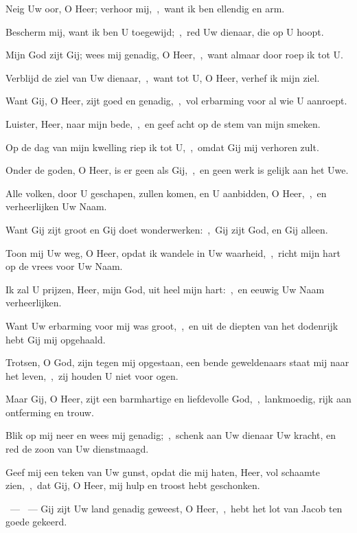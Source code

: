 \documentclass[12pt,twoside,a5paper]{article}
\begin{document}
\begin{halfparskip}
   Neig Uw oor, O Heer; verhoor mij,~\sep\ want ik ben ellendig en arm.

  Bescherm mij, want ik ben U toegewijd;~\sep\ red Uw dienaar, die op U hoopt.

  Mijn God zijt Gij; wees mij genadig, O Heer,~\sep\ want almaar door roep ik tot U.

  Verblijd de ziel van Uw dienaar,~\sep\ want tot U, O Heer, verhef ik mijn ziel.

  Want Gij, O Heer, zijt goed en genadig,~\sep\ vol erbarming voor al wie U aanroept.

  Luister, Heer, naar mijn bede,~\sep\ en geef acht op de stem van mijn smeken.

  Op de dag van mijn kwelling riep ik tot U,~\sep\ omdat Gij mij verhoren zult.

  Onder de goden, O Heer, is er geen als Gij,~\sep\ en geen werk is gelijk aan het Uwe.

  Alle volken, door U geschapen, zullen komen, en U aanbidden, O Heer,~\sep\ en verheerlijken Uw Naam.

  Want Gij zijt groot en Gij doet wonderwerken:~\sep\ Gij zijt God, en Gij alleen.

  Toon mij Uw weg, O Heer, opdat ik wandele in Uw waarheid,~\sep\ richt mijn hart op de vrees voor Uw Naam.

  Ik zal U prijzen, Heer, mijn God, uit heel mijn hart:~\sep\ en eeuwig Uw Naam verheerlijken.

  Want Uw erbarming voor mij was groot,~\sep\ en uit de diepten van het dodenrijk hebt Gij mij opgehaald.

  Trotsen, O God, zijn tegen mij opgestaan, een bende geweldenaars staat mij naar het leven,~\sep\ zij houden U niet voor ogen.

  Maar Gij, O Heer, zijt een barmhartige en liefdevolle God,~\sep\ lankmoedig, rijk aan ontferming en trouw.

  Blik op mij neer en wees mij genadig;~\sep\ schenk aan Uw dienaar Uw kracht, en red de zoon van Uw dienstmaagd.

  Geef mij een teken van Uw gunst, opdat die mij haten, Heer, vol schaamte zien,~\sep\ dat Gij, O Heer, mij hulp en troost hebt geschonken.

  ~--- ~--- Gij zijt Uw land genadig geweest, O Heer,~\sep\ hebt het lot van Jacob ten goede gekeerd.
\end{halfparskip}
\end{document}
